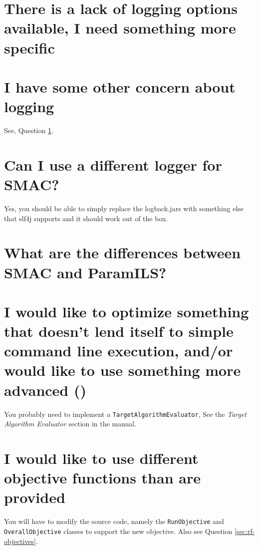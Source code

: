 \documentclass[11pt,letterpaper,oneside]{article}
\begin{document}
\section{There is a lack of logging options available, I need something more specific}
\label{sec:alternative-logging}
	

	
\section{I have some other concern about logging}
	See, Question \ref{sec:alternative-logging}.

\section{Can I use a different logger for SMAC?}

	Yes, you should be able to simply replace the logback.jars with something else that slf4j supports and it should work out of the box. 

\section{What are the differences between SMAC and ParamILS?}





\section{I would like to optimize something that doesn't lend itself to simple command line execution, and/or would like to use something more advanced ()}

	You probably need to implement a \texttt{TargetAlgorithmEvaluator}, See the \emph{Target Algorithm Evaluator} section in the manual.

\section{I would like to use different objective functions than are provided}

	You will have to modify the source code, namely the \texttt{RunObjective} and \texttt{OverallObjective} classes to support the new objective. Also see Question \ref{sec:rf-objectives}.
\end{document}

